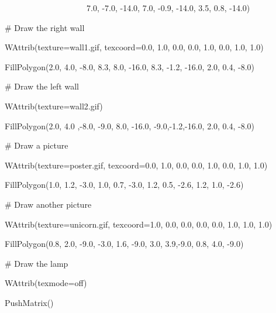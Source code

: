 \documentclass[letterpaper]{article}
\begin{document}
{{\sffamily
\ \ \ \ \ \ \ \ \ \ \ \ \ \ \ \ \ \ \ \ \ \ \ 7.0, -7.0, -14.0, 7.0, -0.9, -14.0, 3.5, 0.8, -14.0)}


\bigskip

{\sffamily
\ \ \ \# Draw the right wall}

{\sffamily
\ \ \ WAttrib({\textquotedbl}texture=wall1.gif{\textquotedbl}, {\textquotedbl}texcoord=0.0, 1.0, 0.0, 0.0, 1.0, 0.0,
1.0, 1.0{\textquotedbl})}

{\sffamily
\ \ \ FillPolygon(2.0, 4.0, -8.0, 8.3, 8.0, -16.0, 8.3, -1.2, -16.0, 2.0, 0.4, -8.0)}


\bigskip

{\sffamily
\ \ \ \# Draw the left wall}

{\sffamily
\ \ \ WAttrib({\textquotedbl}texture=wall2.gif{\textquotedbl})}

{\sffamily
\ \ \ FillPolygon(2.0, 4.0 ,-8.0, -9.0, 8.0, -16.0, -9.0,-1.2,-16.0, 2.0, 0.4, -8.0)}


\bigskip

{\sffamily
\ \ \ \# Draw a picture}

{\sffamily
\ \ \ WAttrib({\textquotedbl}texture=poster.gif{\textquotedbl}, {\textquotedbl}texcoord=0.0, 1.0, 0.0, 0.0, 1.0, 0.0,
1.0, 1.0{\textquotedbl})}

{\sffamily
\ \ \ FillPolygon(1.0, 1.2, -3.0, 1.0, 0.7, -3.0, 1.2, 0.5, -2.6, 1.2, 1.0, -2.6)}


\bigskip

{\sffamily
\ \ \ \# Draw another picture}

{\sffamily
\ \ \ WAttrib({\textquotedbl}texture=unicorn.gif{\textquotedbl}, {\textquotedbl}texcoord=1.0, 0.0, 0.0, 0.0, 0.0, 1.0,
1.0, 1.0{\textquotedbl})}

{\sffamily
\ \ \ FillPolygon(0.8, 2.0, -9.0, -3.0, 1.6, -9.0, 3.0, 3.9,-9.0, 0.8, 4.0, -9.0)}


\bigskip

{\sffamily
\ \ \ \# Draw the lamp}

{\sffamily
\ \ \ WAttrib({\textquotedbl}texmode=off{\textquotedbl})}

{\sffamily
\ \ \ PushMatrix()}

}
\end{document}
